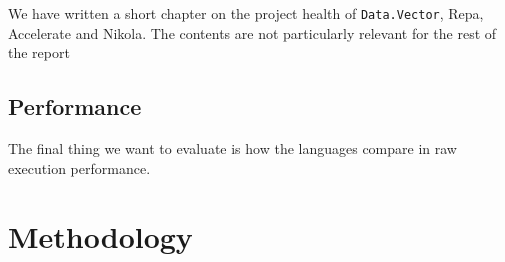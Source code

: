 We have written a short chapter on the project health of
\texttt{Data.Vector}, Repa, Accelerate and Nikola. The contents are
not particularly relevant for the rest of the report 

\subsection{Performance} The final thing we want to evaluate is how
the languages compare in raw execution performance.


\section{Methodology}




